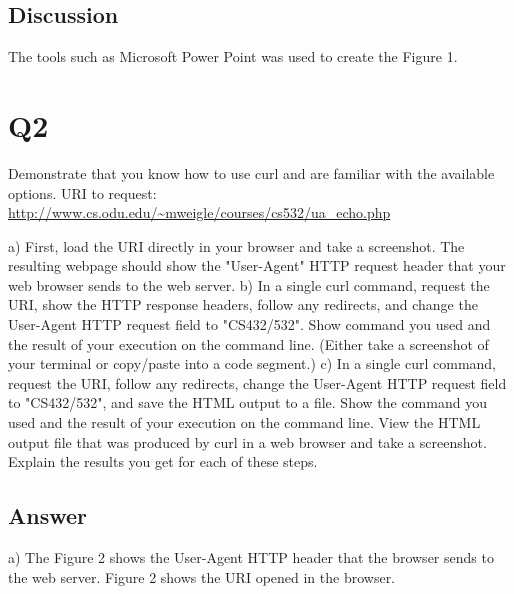 \documentclass[12pt]{article}
\begin{document}
\subsection*{Discussion}

The tools such as Microsoft Power Point was used to create the Figure 1.

\section*{Q2}
Demonstrate that you know how to use curl and are familiar with the available options.
\newline
\newline
URI to request: \url{http://www.cs.odu.edu/~mweigle/courses/cs532/ua_echo.php}

a) First, load the URI directly in your browser and take a screenshot. The resulting webpage should show the "User-Agent" HTTP request header that your web browser sends to the web server.
\newline
\newline
b) In a single curl command, request the URI, show the HTTP response headers, follow any redirects, and change the User-Agent HTTP request field to "CS432/532". Show command you used and the result of your execution on the command line. (Either take a screenshot of your terminal or copy/paste into a code segment.)
\newline
\newline
c) In a single curl command, request the URI, follow any redirects, change the User-Agent HTTP request field to "CS432/532", and save the HTML output to a file. Show the command you used and the result of your execution on the command line. View the HTML output file that was produced by curl in a web browser and take a screenshot.
\newline
\newline
Explain the results you get for each of these steps.

\subsection*{Answer}

a) The Figure 2 shows the User-Agent HTTP header that the browser sends to the web server.
\newline
Figure 2 shows the URI opened in the browser.
\end{document}
